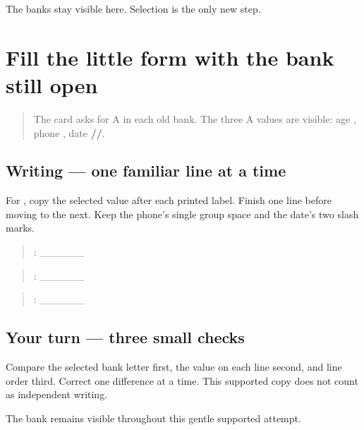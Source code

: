 \begin{tcolorbox}[breakable,colback=teal!4,colframe=teal!35!black,title={Before you move on}]
The banks stay visible here. Selection is the only new step.
\end{tcolorbox}
\section[\texorpdfstring{\pa{ਉਮਰ}: \pa{੧੫} · \pa{ਫ਼ੋਨ} … (supported …)}{ਉਮਰ: ੧੫ · ਫ਼ੋਨ … (supported …)}]{Fill the little form with the bank still open}

\label{lesson:PA-W10-form-supported}



\begin{quote}
The card \textbf{} asks for A in each old bank. The three A values are visible: age \textbf{}, phone \textbf{ }, date \textbf{//}.
\end{quote}

\subsection*{Writing — one familiar line at a time}
For \textbf{}, copy the selected value after each printed label. Finish one line before moving to the next. Keep the phone's single group space and the date's two slash marks.

\begin{quote}
: \_\_\_\_\_\_
\end{quote}

\begin{quote}
: \_\_\_\_\_\_
\end{quote}

\begin{quote}
: \_\_\_\_\_\_
\end{quote}

\subsection*{Your turn — three small checks}
Compare the selected bank letter first, the value on each line second, and line order third. Correct one difference at a time. This supported copy does not count as independent writing.

\begin{tcolorbox}[breakable,colback=teal!4,colframe=teal!35!black,title={Before you move on}]
The bank remains visible throughout this gentle supported attempt.
\end{tcolorbox}
